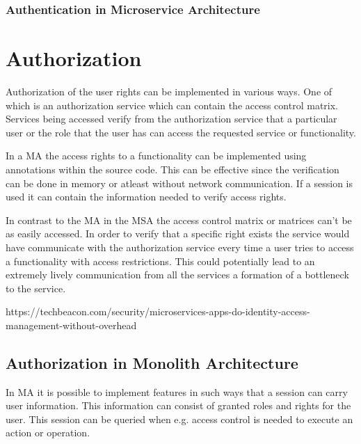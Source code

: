\subsubsection{Authentication in Microservice Architecture}
\begin{sloppypar}
\end{sloppypar}




\section{Authorization}
\begin{sloppypar}
    Authorization of the user rights can be implemented in various ways. One of 
    which is an authorization service which can contain the access control 
    matrix. Services being accessed verify from the authorization service that
    a particular user or the role that the user has can access the requested 
    service or functionality.
\end{sloppypar}
\begin{sloppypar}
    In a MA the access rights to a functionality can be implemented using
    annotations within the source code. This can be effective since the 
    verification can be done in memory or atleast without network communication. 
    If a session is used it can contain the information needed to verify access 
    rights.
\end{sloppypar}
\begin{sloppypar}
    In contrast to the MA in the MSA the access control matrix or matrices can't 
    be as easily accessed. In order to verify that a specific right exists the 
    service would have communicate with the authorization service every time a user
    tries to access a functionality with access restrictions. This could 
    potentially lead to an extremely lively communication from all the services 
    a formation of a bottleneck to the service.
\end{sloppypar}
\begin{sloppypar}
    https://techbeacon.com/security/microservices-apps-do-identity-access-management-without-overhead
\end{sloppypar}

\subsection{Authorization in Monolith Architecture}
\begin{sloppypar}
    In MA it is possible to implement features in such ways that a session can 
    carry user information. This information can consist of granted roles and 
    rights for the user. This session can be queried when e.g. access control 
    is needed to execute an action or operation.
\end{sloppypar}


